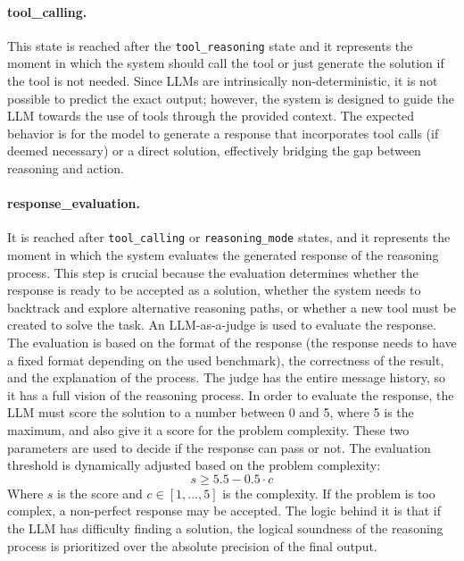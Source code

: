 \documentclass[12pt,a4paper,openright,twoside]{book}
\begin{document}
\paragraph{tool\_calling.} This state is reached after the \texttt{tool\_reasoning} state and it represents the moment in which the system should call the tool or just generate the solution if the tool is not needed. Since \acp{LLM} are intrinsically non-deterministic, it is not possible to predict the exact output; however, the system is designed to guide the \ac{LLM} towards the use of tools through the provided context. The expected behavior is for the model to generate a response that incorporates tool calls (if deemed necessary) or a direct solution, effectively bridging the gap between reasoning and action.

\paragraph{response\_evaluation.} It is reached after \texttt{tool\_calling} or \texttt{reasoning\_mode} states, and it represents the moment in which the system evaluates the generated response of the reasoning process.
%
This step is crucial because the evaluation determines whether the response is ready to be accepted as a solution, whether the system needs to backtrack and explore alternative reasoning paths, or whether a new tool must be created to solve the task.
%
An LLM-as-a-judge is used to evaluate the response. The evaluation is based on the format of the response (the response needs to have a fixed format depending on the used benchmark), the correctness of the result, and the explanation of the process.
%
The judge has the entire message history, so it has a full vision of the reasoning process. In order to evaluate the response, the \ac{LLM} must score the solution to a number between 0 and 5, where 5 is the maximum, and also give it a score for the problem complexity. These two parameters are used to decide if the response can pass or not. 
The evaluation threshold is dynamically adjusted based on the problem complexity:
\[
    s \geq 5.5 - 0.5 \cdot c
\]
Where $s$ is the score and $c \in [1,...,5]$ is the complexity. If the problem is too complex, a non-perfect response may be accepted. The logic behind it is that if the \ac{LLM} has difficulty finding a solution, the logical soundness of the reasoning process is prioritized over the absolute precision of the final output.
\end{document}
